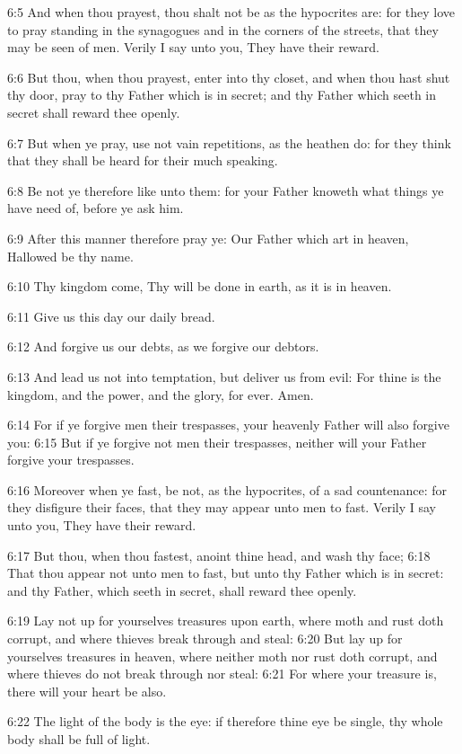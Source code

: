 6:5 And when thou prayest, thou shalt not be as the hypocrites are: for they love to pray standing in the synagogues and in the corners of the streets, that they may be seen of men. Verily I say unto you, They have their reward.

6:6 But thou, when thou prayest, enter into thy closet, and when thou hast shut thy door, pray to thy Father which is in secret; and thy Father which seeth in secret shall reward thee openly.

6:7 But when ye pray, use not vain repetitions, as the heathen do: for they think that they shall be heard for their much speaking.

6:8 Be not ye therefore like unto them: for your Father knoweth what things ye have need of, before ye ask him.

6:9 After this manner therefore pray ye: Our Father which art in heaven, Hallowed be thy name.

6:10 Thy kingdom come, Thy will be done in earth, as it is in heaven.

6:11 Give us this day our daily bread.

6:12 And forgive us our debts, as we forgive our debtors.

6:13 And lead us not into temptation, but deliver us from evil: For thine is the kingdom, and the power, and the glory, for ever. Amen.

6:14 For if ye forgive men their trespasses, your heavenly Father will also forgive you: 6:15 But if ye forgive not men their trespasses, neither will your Father forgive your trespasses.

6:16 Moreover when ye fast, be not, as the hypocrites, of a sad countenance: for they disfigure their faces, that they may appear unto men to fast. Verily I say unto you, They have their reward.

6:17 But thou, when thou fastest, anoint thine head, and wash thy face; 6:18 That thou appear not unto men to fast, but unto thy Father which is in secret: and thy Father, which seeth in secret, shall reward thee openly.

6:19 Lay not up for yourselves treasures upon earth, where moth and rust doth corrupt, and where thieves break through and steal: 6:20 But lay up for yourselves treasures in heaven, where neither moth nor rust doth corrupt, and where thieves do not break through nor steal: 6:21 For where your treasure is, there will your heart be also.

6:22 The light of the body is the eye: if therefore thine eye be single, thy whole body shall be full of light.

